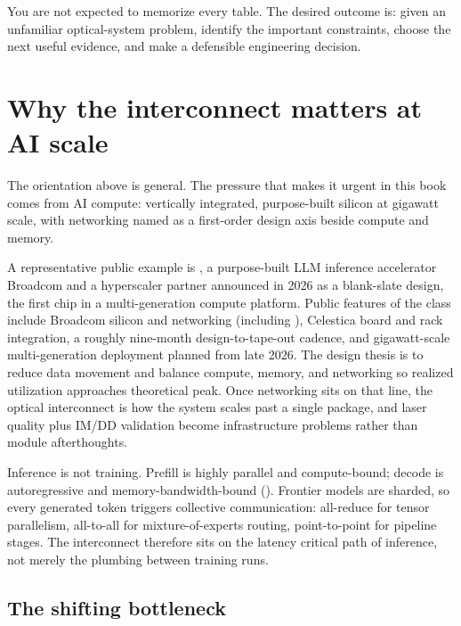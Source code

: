 You are not expected to memorize every table. The desired outcome is: given an
unfamiliar optical-system problem, identify the important constraints, choose the
next useful evidence, and make a defensible engineering decision.

\section{Why the interconnect matters at AI scale}

The orientation above is general. The pressure that makes it urgent in this book
comes from AI compute: vertically integrated, purpose-built silicon at gigawatt
scale, with networking named as a first-order design axis beside compute and
memory.

A representative public example is , a purpose-built LLM
inference accelerator Broadcom and a hyperscaler partner announced in 2026 as a
blank-slate design, the first chip in a multi-generation compute
platform. Public features of the class
include Broadcom silicon and networking (including ), Celestica
board and rack integration, a roughly nine-month design-to-tape-out cadence, and
gigawatt-scale multi-generation deployment planned from late 2026. The design
thesis is to reduce data movement and balance compute, memory, and networking so
realized utilization approaches theoretical peak. Once networking sits on that
line, the optical interconnect is how the system scales past a single package,
and laser quality plus IM/DD validation become infrastructure problems rather
than module afterthoughts.

Inference is not training. Prefill is highly parallel and compute-bound; decode
is autoregressive and memory-bandwidth-bound
(). Frontier models are sharded,
so every generated token triggers collective communication: all-reduce for
tensor parallelism, all-to-all for mixture-of-experts routing, point-to-point for
pipeline stages. The interconnect therefore sits on the latency critical path of
inference, not merely the plumbing between training runs.

\subsection{The shifting bottleneck}
\label{sec:shifting-bottleneck}

